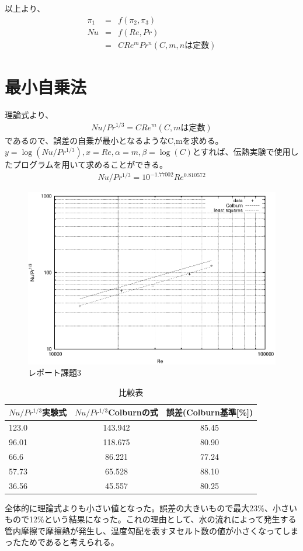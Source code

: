 \documentclass[a4j,twoside,openright,11pt]{jarticle}
\begin{document}
以上より、
\begin{eqnarray}
\pi_1 &=& f(\pi_2,\pi_3)\nonumber\\
Nu    &=& f(Re,Pr)\nonumber\\
      &=& CRe^mPr^n (C,m,nは定数)
\end{eqnarray}
\section{最小自乗法}
理論式より、
\begin{eqnarray}
Nu/Pr^{1/3}=CRe^m (C,mは定数)\nonumber
\end{eqnarray}
であるので、誤差の自乗が最小となるようなC,mを求める。$y=\log (Nu/Pr^{1/3}),x=Re,\alpha = m,\beta = \log(C)$とすれば、伝熱実験で使用したプログラムを用いて求めることができる。
\begin{eqnarray}
  Nu/Pr^{1/3}=10^{-1.77002}Re^{0.810572}
\end{eqnarray}

\begin{figure}[htbp]
\begin{center}
\includegraphics[width=14cm]{./Colburn/data.eps}
\end{center}
\caption{レポート課題3}
\end{figure}
\begin{table}[htb]
\begin{center}
  \caption{比較表}
  \begin{tabular}{|l|c|c|} \hline
$Nu/Pr^{1/3}$実験式&$Nu/Pr^{1/3}$Colburnの式&誤差(Colburn基準[\%])\\
\hline
123.0&143.942&85.45\\
96.01&118.675&80.90\\
66.6 & 86.221&77.24\\
57.73& 65.528&88.10\\
36.56& 45.557&80.25\\\hline
  \end{tabular}
\end{center}
\end{table}
全体的に理論式よりも小さい値となった。誤差の大きいもので最大23\%、小さいもので12\%という結果になった。これの理由として、水の流れによって発生する管内摩擦で摩擦熱が発生し、温度勾配を表すヌセルト数の値が小さくなってしまったためであると考えられる。
\end{document}
